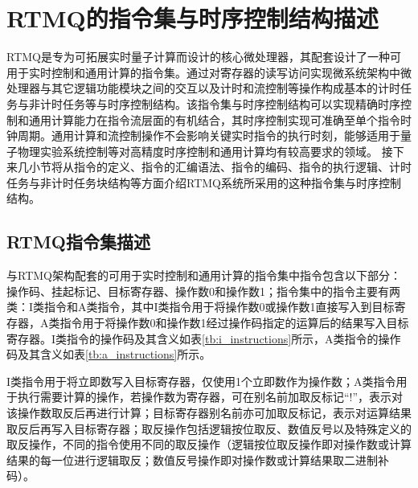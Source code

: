 


\section[RTMQ的指令集与时序控制结构描述]{RTMQ的指令集与时序控制结构描述}
RTMQ是专为可拓展实时量子计算而设计的核心微处理器，其配套设计了一种可用于实时控制和通用计算的指令集\cite[]{junhua03}。通过对寄存器的读写访问实现微系统架构中微处理器与其它逻辑功能模块之间的交互以及计时和流控制等操作构成基本的计时任务与非计时任务等与时序控制结构。该指令集与时序控制结构可以实现精确时序控制和通用计算能力在指令流层面的有机结合，其时序控制实现可准确至单个指令时钟周期。通用计算和流控制操作不会影响关键实时指令的执行时刻，能够适用于量子物理实验系统控制等对高精度时序控制和通用计算均有较高要求的领域。
接下来几小节将从指令的定义、指令的汇编语法、指令的编码、指令的执行逻辑、计时任务与非计时任务块结构等方面介绍RTMQ系统所采用的这种指令集与时序控制结构。

\subsection[RTMQ指令集描述]{RTMQ指令集描述\label{section:rtmq_instruction_set}}

与RTMQ架构配套的可用于实时控制和通用计算的指令集中指令包含以下部分：操作码、挂起标记、目标寄存器、操作数0和操作数1；指令集中的指令主要有两类：I类指令和A类指令，其中I类指令用于将操作数0或操作数1直接写入到目标寄存器，A类指令用于将操作数0和操作数1经过操作码指定的运算后的结果写入目标寄存器。I类指令的操作码及其含义如表\ref{tb:i_instructions}所示，A类指令的操作码及其含义如表\ref{tb:a_instructions}所示。

I类指令用于将立即数写入目标寄存器，仅使用1个立即数作为操作数；A类指令用于执行需要计算的操作，若操作数为寄存器，可在别名前加取反标记“!”，表示对该操作数取反后再进行计算；目标寄存器别名前亦可加取反标记，表示对运算结果取反后再写入目标寄存器；取反操作包括逻辑按位取反、数值反号以及特殊定义的取反操作，不同的指令使用不同的取反操作（逻辑按位取反操作即对操作数或计算结果的每一位进行逻辑取反；数值反号操作即对操作数或计算结果取二进制补码）。

